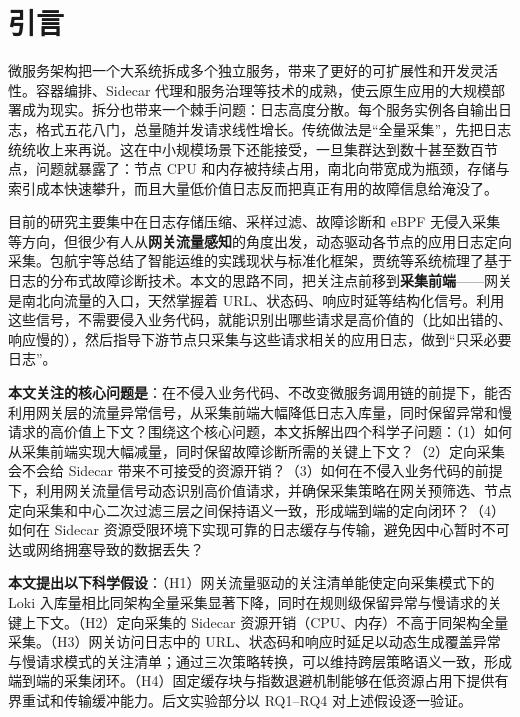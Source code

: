 \section{引言}

微服务架构把一个大系统拆成多个独立服务，带来了更好的可扩展性和开发灵活性。容器编排、Sidecar 代理和服务治理等技术的成熟，使云原生应用的大规模部署成为现实\cite{burns2016patterns,burns2016borg,jamshidi2018microservices,richardson2018microservices,feng2020microservice,wuhuayao2020microdev}。拆分也带来一个棘手问题：日志高度分散。每个服务实例各自输出日志，格式五花八门，总量随并发请求线性增长。传统做法是``全量采集''，先把日志统统收上来再说。这在中小规模场景下还能接受，一旦集群达到数十甚至数百节点，问题就暴露了：节点 CPU 和内存被持续占用，南北向带宽成为瓶颈，存储与索引成本快速攀升，而且大量低价值日志反而把真正有用的故障信息给淹没了\cite{liao2016logs,limingshu2019logmgmt,he2020logsurvey,usman2022observability}。

目前的研究主要集中在日志存储压缩、采样过滤、故障诊断和 eBPF 无侵入采集等方向，但很少有人从\textbf{网关流量感知}的角度出发，动态驱动各节点的应用日志定向采集。包航宇等\cite{bao2023aiops}总结了智能运维的实践现状与标准化框架，贾统等\cite{jiatong2020logdiag}系统梳理了基于日志的分布式故障诊断技术。本文的思路不同，把关注点前移到\textbf{采集前端}——网关是南北向流量的入口，天然掌握着 URL、状态码、响应时延等结构化信号。利用这些信号，不需要侵入业务代码，就能识别出哪些请求是高价值的（比如出错的、响应慢的），然后指导下游节点只采集与这些请求相关的应用日志，做到``只采必要日志''。

\textbf{本文关注的核心问题是}：在不侵入业务代码、不改变微服务调用链的前提下，能否利用网关层的流量异常信号，从采集前端大幅降低日志入库量，同时保留异常和慢请求的高价值上下文？围绕这个核心问题，本文拆解出四个科学子问题：（1）如何从采集前端实现大幅减量，同时保留故障诊断所需的关键上下文？（2）定向采集会不会给 Sidecar 带来不可接受的资源开销？（3）如何在不侵入业务代码的前提下，利用网关流量信号动态识别高价值请求，并确保采集策略在网关预筛选、节点定向采集和中心二次过滤三层之间保持语义一致，形成端到端的定向闭环？（4）如何在 Sidecar 资源受限环境下实现可靠的日志缓存与传输，避免因中心暂时不可达或网络拥塞导致的数据丢失？

\textbf{本文提出以下科学假设}：（H1）网关流量驱动的关注清单能使定向采集模式下的 Loki 入库量相比同架构全量采集显著下降，同时在规则级保留异常与慢请求的关键上下文。（H2）定向采集的 Sidecar 资源开销（CPU、内存）不高于同架构全量采集。（H3）网关访问日志中的 URL、状态码和响应时延足以动态生成覆盖异常与慢请求模式的关注清单；通过三次策略转换，可以维持跨层策略语义一致，形成端到端的采集闭环。（H4）固定缓存块与指数退避机制能够在低资源占用下提供有界重试和传输缓冲能力。后文实验部分以 RQ1--RQ4 对上述假设逐一验证。

